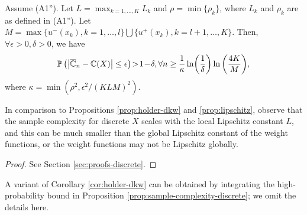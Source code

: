\begin{proposition}
\label{prop:sample-complexity-discrete}
Assume (A1''). Let $L=\max_{k=1,\ldots,K} L_k$ and $\rho =\min\{\rho_k\}$, where $L_k$ and $\rho_k$ are as defined in (A1'').
Let $M=\max\{u^{-}(x_k), k=1,\ldots,l\} \bigcup \{u^{+}(x_k), k=l+1,\ldots,K\}$.
Then, $\forall \epsilon>0,\delta >0$, we have 
\begin{align*}
\mathbb{P}\left( \left|
\overline {\mathbb{C}}_n -\mathbb{C}(X)
\right| \leq \epsilon \right) \! > \! 1\!-\!\delta, \forall n \ge \frac{1}{\kappa}\ln\!\left(\frac{1}{\delta}\right) \ln\left(\frac{4K}{M}\right)\!, 
\end{align*}
where $\kappa=\min(\rho^2, \epsilon^2/(KLM)^2)$.
\end{proposition}

In comparison to Propositions \ref{prop:holder-dkw} and \ref{prop:lipschitz}, 
observe that the sample complexity for discrete $X$ scales with the local Lipschitz constant $L$, and this can be much smaller than the global Lipschitz constant of the weight functions, or the weight functions may not be Lipschitz globally.  

\begin{proof}
 See Section \ref{sec:proofs-discrete}.
\end{proof}

A variant of Corollary \ref{cor:holder-dkw} can be obtained by integrating the high-probability bound in Proposition \ref{prop:sample-complexity-discrete}; we omit the details here.

